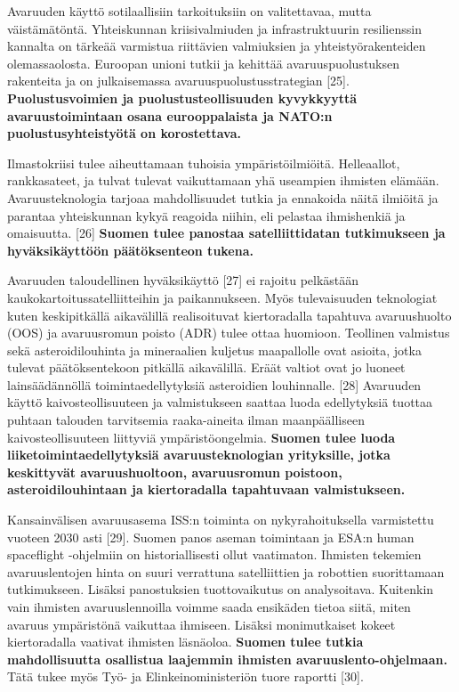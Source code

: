 \documentclass[nobib,finnish,oneside,openany,notoc,a4paper]{tufte-book}
\begin{document}
Avaruuden käyttö sotilaallisiin tarkoituksiin on valitettavaa, mutta
väistämätöntä. Yhteiskunnan kriisivalmiuden ja infrastruktuurin
resilienssin kannalta on tärkeää varmistua riittävien valmiuksien ja yhteistyörakenteiden
olemassaolosta. Euroopan unioni tutkii ja kehittää avaruuspuolustuksen
rakenteita ja on julkaisemassa avaruuspuolustusstrategian [25].
\textbf{Puolustusvoimien ja puolustusteollisuuden
kyvykkyyttä avaruustoimintaan osana eurooppalaista ja NATO:n
puolustusyhteistyötä on korostettava.}

Ilmastokriisi tulee aiheuttamaan tuhoisia ympäristöilmiöitä.
Helleaallot, rankkasateet, ja tulvat tulevat vaikuttamaan yhä useampien
ihmisten elämään. Avaruusteknologia tarjoaa mahdollisuudet tutkia ja
ennakoida näitä ilmiöitä ja parantaa yhteiskunnan kykyä reagoida niihin,
eli pelastaa ihmishenkiä ja omaisuutta. {[}26{]} \textbf{Suomen tulee
panostaa satelliittidatan tutkimukseen ja hyväksikäyttöön päätöksenteon
tukena. }

Avaruuden taloudellinen hyväksikäyttö {[}27{]} ei rajoitu pelkästään
kaukokartoitussatelliitteihin ja paikannukseen. Myös tulevaisuuden
teknologiat kuten keskipitkällä aikavälillä realisoituvat kiertoradalla
tapahtuva avaruushuolto (OOS) ja avaruusromun poisto (ADR) tulee ottaa
huomioon. Teollinen valmistus sekä asteroidilouhinta ja mineraalien
kuljetus maapallolle ovat asioita, jotka tulevat päätöksentekoon
pitkällä aikavälillä. Eräät valtiot ovat jo luoneet lainsäädännöllä
toimintaedellytyksiä asteroidien louhinnalle. {[}28{]} Avaruuden käyttö
kaivosteollisuuteen ja valmistukseen saattaa luoda edellytyksiä tuottaa
puhtaan talouden tarvitsemia raaka-aineita ilman maanpäälliseen
kaivosteollisuuteen liittyviä ympäristöongelmia. \textbf{Suomen tulee
luoda liiketoimintaedellytyksiä avaruusteknologian yrityksille, jotka
keskittyvät avaruushuoltoon, avaruusromun poistoon, asteroidilouhintaan
ja kiertoradalla tapahtuvaan valmistukseen.}

Kansainvälisen avaruusasema ISS:n toiminta on nykyrahoituksella
varmistettu vuoteen 2030 asti {[}29{]}. Suomen panos aseman toimintaan
ja ESA:n human spaceflight -ohjelmiin on historiallisesti ollut
vaatimaton. Ihmisten tekemien avaruuslentojen hinta on suuri verrattuna
satelliittien ja robottien suorittamaan tutkimukseen. Lisäksi
panostuksien tuottovaikutus on analysoitava. Kuitenkin vain ihmisten
avaruuslennoilla voimme saada ensikäden tietoa siitä, miten avaruus
ympäristönä vaikuttaa ihmiseen. Lisäksi monimutkaiset kokeet
kiertoradalla vaativat ihmisten läsnäoloa. \textbf{Suomen tulee tutkia
mahdollisuutta osallistua laajemmin ihmisten avaruuslento-ohjelmaan.
}Tätä tukee myös Työ- ja Elinkeinoministeriön tuore raportti {[}30{]}.
\end{document}
